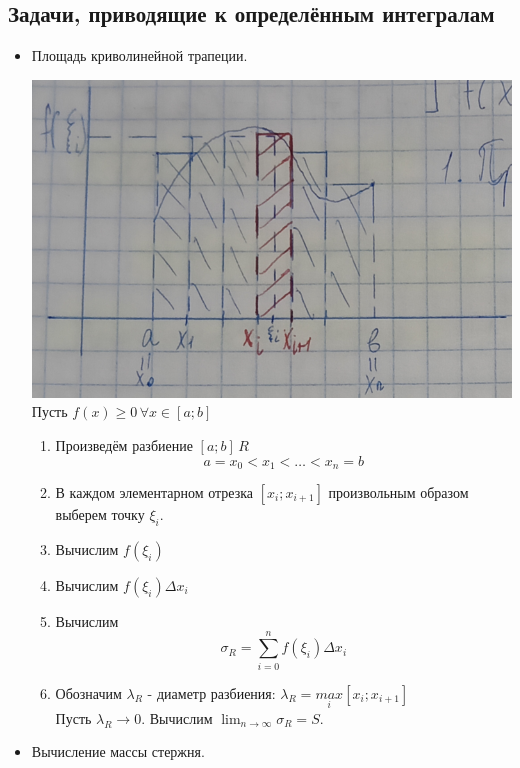 \documentclass[12pt]{article}
\begin{document}
    \subsection{Задачи, приводящие к определённым интегралам}
    \begin{itemize}
        \item Площадь криволинейной трапеции.
        \begin{adjustwidth}{1.5em}{1.5em}
            \includegraphics{6.1.1.png}\\
            Пусть $f(x) \ge 0\, \forall x \in [a;b]$
            \begin{enumerate}
                \item Произведём разбиение $[a;b]\, R$
                \[ a = x_0 < x_1 < \dots < x_n = b \]
                \item В каждом элементарном отрезка $[x_i; x_{i+1}]$ произвольным образом выберем точку $\xi_i$.
                \item Вычислим $f(\xi_i)$
                \item Вычислим $f(\xi_i)\Delta x_i$
                \item Вычислим \[ \sigma_R = \sum_{i=0}^{n}f(\xi_i)\Delta x_i \]
                \item Обозначим $\lambda_R$ - диаметр разбиения: $\lambda_R = \underset{i}{max}[x_i; x_{i+1}]$\\
                Пусть $\lambda_R \to 0$. Вычислим $\lim_{n\to\infty}\sigma_R = S$.
            \end{enumerate}
        \end{adjustwidth}
        \item Вычисление массы стержня.
    \end{itemize}
\end{document}
